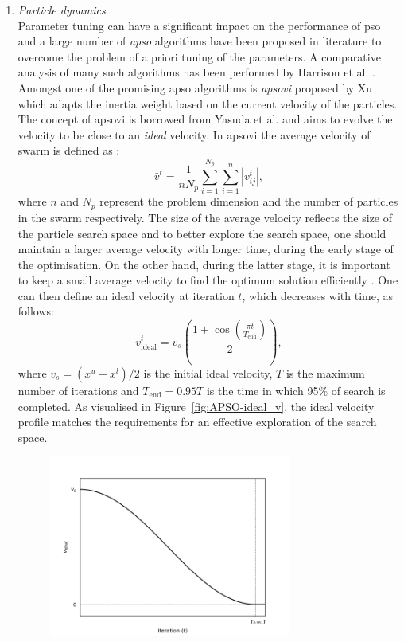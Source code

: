 \begin{enumerate}
		\item \emph{Particle dynamics}\\
			Parameter tuning can have a significant impact on the performance of \gls{pso} and a large number of \emph{\gls{apso}} algorithms have been proposed in literature to overcome the problem of a priori tuning of the parameters. A comparative analysis of many such algorithms has been performed by Harrison et al. \cite{Harrison:2018aa}. Amongst one of the promising \gls{apso} algorithms is \emph{\gls{apsovi}} proposed by Xu \cite{Xu:2013aa} which adapts the inertia weight based on the current velocity of the particles. The concept of \gls{apsovi} is borrowed from Yasuda et al. \cite{Yasuda:2008aa} and aims to evolve the velocity to be close to an \emph{ideal} velocity. In \gls{apsovi} the average velocity of swarm is defined as \cite{Xu:2013aa}:
			\begin{equation}
				\bar{v}^t = \frac{1}{n N_p} \sum_{i=1}^{N_p} \sum_{i=1}^{n} \left | v_{ij}^t \right |,
			\end{equation}
			where $n$ and $N_p$ represent the problem dimension and the number of particles in the swarm respectively. The size of the average velocity reflects the size of the particle search space and to better explore the search space, one should maintain a larger average velocity with longer time, during the early stage of the optimisation. On the other hand, during the latter stage, it is important to keep a small average velocity to find the optimum solution efficiently \cite{Xu:2013aa}. One can then define an ideal velocity at iteration $t$, which decreases with time, as follows:
			\begin{equation}
				{v}_\text{ideal}^t = v_s \left(\frac{1 + \cos\left (\frac{\pi t}{T_\text{end}} \right )}{2} \right),
			\end{equation}
			where $v_s = (x^u - x^l) / 2$ is the initial ideal velocity, $T$ is the maximum number of iterations and $T_\text{end} = 0.95 T$ is the time in which 95\% of search is completed. As visualised in Figure~\ref{fig:APSO-ideal_v}, the ideal velocity profile matches the requirements for an effective exploration of the search space.
			\begin{figure}[htbp]
				\centering
				\includegraphics[width=0.75\textwidth]{figures/chapter-6/APSO-VI}

\end{figure}
\end{enumerate}
